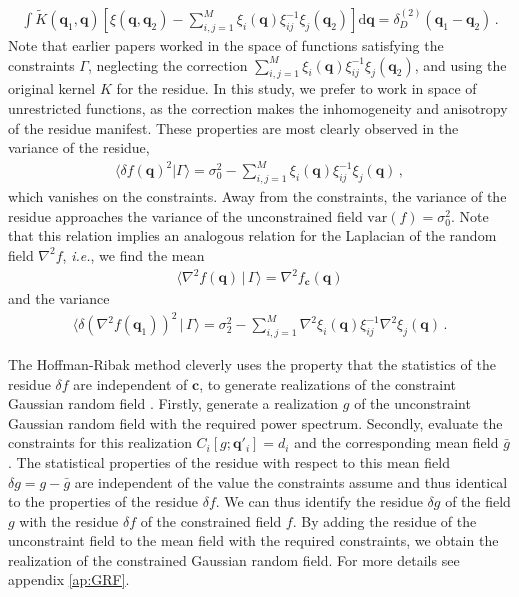 \documentclass[a4paper, 11pt]{article}
\begin{document}
\begin{align}
\int \tilde{K}(\bm{q}_1,\bm{q}) \left[\xi(\bm{q},\bm{q}_2) - \sum_{i,j=1}^M\xi_i(\bm{q})\xi_{ij}^{-1}\xi_j(\bm{q}_2)\right]\mathrm{d}\bm{q}= \delta_D^{(2)}(\bm{q}_1-\bm{q}_2)\,.
\end{align}
Note that earlier papers \cite{Bertschinger:1987, Hoffman:1991, Sheth:1995, Weygaert:1996} worked in the space of functions satisfying the constraints $\Gamma$, neglecting the correction $\sum_{i,j=1}^M\xi_i(\bm{q})\xi_{ij}^{-1}\xi_j(\bm{q}_2)$, and using the original kernel $K$ for the residue. In this study, we prefer to work in space of unrestricted functions, as the correction makes the inhomogeneity and anisotropy of the residue manifest. These properties are most clearly observed in the variance of the residue,
\begin{align}
\langle \delta f(\bm{q})^2|\Gamma \rangle = \sigma_0^2- \sum_{i,j=1}^M\xi_i(\bm{q})\xi_{ij}^{-1}\xi_j(\bm{q})\,,\label{eq:variance_Linear}
\end{align}
which vanishes on the constraints. Away from the constraints, the variance of the residue approaches the variance of the unconstrained  field $\text{var}(f)=\sigma_0^2$. Note that this relation implies an analogous relation for the Laplacian of the random field $\nabla^2 f$, \textit{i.e.}, we find the mean
\begin{align}
\langle \nabla^2 f(\bm{q})\,|\,\Gamma\rangle = \nabla^2 f_{\bm{c}}(\bm{q})
\end{align}
and the variance
\begin{align}
\langle \delta (\nabla^2f(\bm{q}_1))^2\,|\,\Gamma \rangle = \sigma_2^2- \sum_{i,j=1}^M\nabla^2\xi_i(\bm{q})\xi_{ij}^{-1}\nabla^2\xi_j(\bm{q})\,.\label{eq:variance_Linear_Laplace}
\end{align}


The Hoffman-Ribak method cleverly uses the property that the statistics of the residue $\delta f$ are independent of $\bm{c}$, to generate realizations of the constraint Gaussian random field \cite{Hoffman:1991, Weygaert:1996}. Firstly, generate a realization $g$ of the unconstraint Gaussian random field with the required power spectrum. Secondly, evaluate the constraints for this realization $C_i[g;\bm{q}'_i]=d_i$ and the corresponding mean field $\bar{g}$. The statistical properties of the residue with respect to this mean field $\delta g = g-\bar{g}$ are independent of the value the constraints assume and thus identical to the properties of the residue $\delta f$. We can thus identify the residue $\delta g$ of the field $g$ with the residue $\delta f$ of the constrained field $f$. By adding the residue of the unconstraint field to the mean field with the required constraints, we obtain the realization of the constrained Gaussian random field. For more details see appendix \ref{ap:GRF}.
\end{document}
